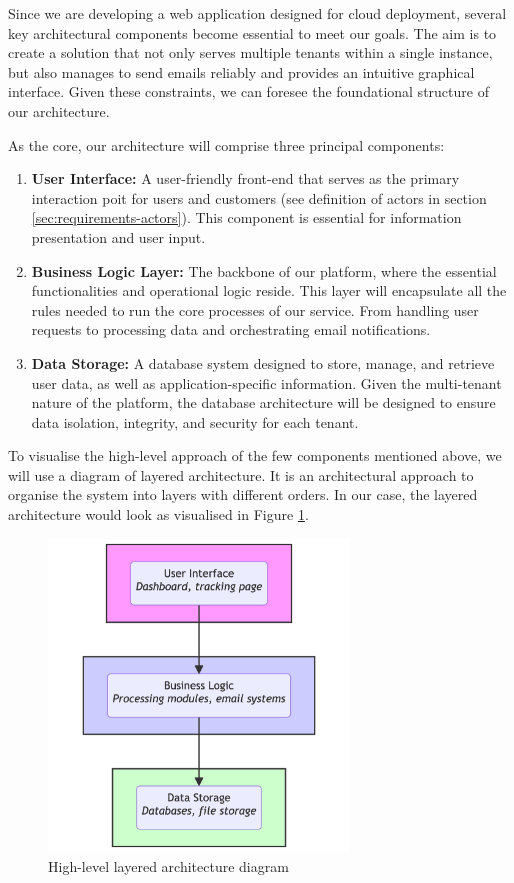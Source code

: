 Since we are developing a web application designed for cloud deployment, several key architectural components become essential to meet our goals.
The aim is to create a solution that not only serves multiple tenants within a single instance, but also manages to send emails reliably and provides an intuitive graphical interface.
Given these constraints, we can foresee the foundational structure of our architecture.

As the core, our architecture will comprise three principal components:
\begin{enumerate}
    \item \textbf{User Interface:} A user-friendly front-end that serves as the primary interaction poit for users and customers (see definition of actors in section \ref{sec:requirements-actors}). This component is essential for information presentation and user input.
    \item \textbf{Business Logic Layer:} The backbone of our platform, where the essential functionalities and operational logic reside. This layer will encapsulate all the rules needed to run the core processes of our service. From handling user requests to processing data and orchestrating email notifications.
    \item \textbf{Data Storage:} A database system designed to store, manage, and retrieve user data, as well as application-specific information. Given the multi-tenant nature of the platform, the database architecture will be designed to ensure data isolation, integrity, and security for each tenant.
\end{enumerate}

To visualise the high-level approach of the few components mentioned above, we will use a diagram of layered architecture. 
It is an architectural approach to organise the system into layers with different orders. 
In our case, the layered architecture would look as visualised in Figure \ref{img03:layered_architecture_diagram}.

\begin{figure}[p]\centering
\includegraphics[width=80mm]{img/chap03/fig_layered_architecture_mermaid.png}
\caption{High-level layered architecture diagram}
\label{img03:layered_architecture_diagram}
\end{figure}

